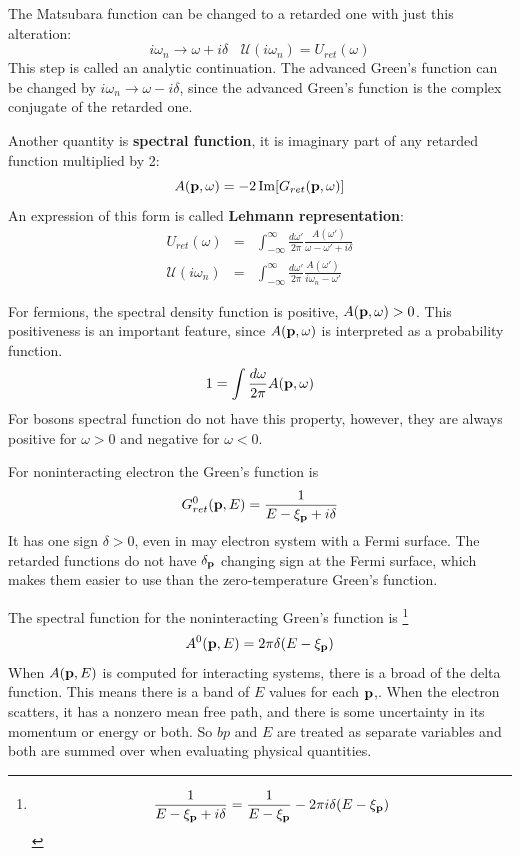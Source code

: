 The Matsubara function can be changed to a retarded one with just this alteration:
\begin{equation}
  i\omega_n \to \omega + i\delta~ ~ ~ ~ \mathcal{U}(i\omega_n) = U_{ret}(\omega)  \label{3.110}
\end{equation}
This step is called an analytic continuation.
The advanced Green's function can be changed by $i\omega_n \to \omega - i\delta$, since the advanced Green's function is the complex conjugate of the retarded one.

Another quantity is \textbf{spectral function}, it is imaginary part of any retarded function multiplied by 2:
\begin{equation}
  A(\mathbf{p},\omega) = -2\Im [G_{ret}(\mathbf{p},\omega)]  \label{3.115}
\end{equation}
An expression of this form is called \textbf{Lehmann representation}:
\begin{eqnarray}
  U_{ret}(\omega) &=& \int_{-\infty}^\infty \frac{d\omega'}{2\pi} \frac{A(\omega')}{\omega-\omega'+i\delta} \nonumber \\
  \mathcal{U}(i\omega_n) &=& \int_{-\infty}^\infty \frac{d\omega'}{2\pi} \frac{A(\omega')}{i\omega_n -\omega'} \label{3.118}
\end{eqnarray}

For fermions, the spectral density function is positive, $A(\mathbf{p},\omega)>0$.
This positiveness is an important feature, since $A(\mathbf{p},\omega)$ is interpreted as a probability function.
\begin{equation}
    1 = \int \frac{d\omega}{2\pi} A(\mathbf{p},\omega) \label{3.121}
\end{equation}
For bosons spectral function do not have this property, however, they are always positive for $\omega>0$ and negative for $\omega<0$.

For noninteracting electron the Green's function is
\begin{equation}
  G_{ret}^0 (\mathbf{p},E)= \frac{1}{E-\xi_{\mathbf{p}} + i\delta} \label{3.129}
\end{equation}
It has one sign $\delta>0$, even in may electron system with a Fermi surface.
The retarded functions do not have $\delta_{\mathbf{p}}$ changing sign at the Fermi surface, which makes them easier to use than the zero-temperature Green's function.

The spectral function for the noninteracting Green's function is \footnote{\begin{equation*}
\frac{1}{E-\xi_{\mathbf{p}} + i\delta} = \frac{1}{E-\xi_{\mathbf{p}}} - 2\pi i \delta(E-\xi_{\mathbf{p}})
\end{equation*}}
\begin{equation}
    A^0(\mathbf{p}, E) = 2\pi \delta(E-\xi_{\mathbf{p}}) \label{3.130}
\end{equation}
When $A(\mathbf{p},E)$ is computed for interacting systems, there is a broad of the delta function.
This means there is a band of $E$ values for each $\mathbf{p}$,.
When the electron scatters, it has a nonzero mean free path, and there is some uncertainty in its momentum or energy or both.
So $bp$ and $E$ are treated as separate variables and both are summed over when evaluating physical quantities.

